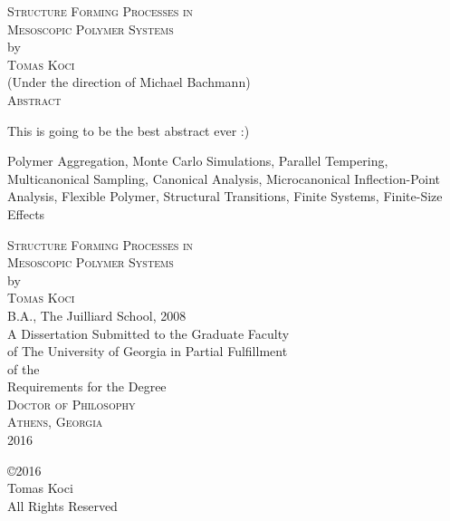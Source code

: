 \documentclass[12pt]{report}
\begin{document}
\newpage
\thispagestyle{empty}
\vspace*{18pt}
\begin{center}
\textsc{Structure Forming Processes in\\Mesoscopic Polymer Systems}\\[18pt]
by\\[18pt]
\textsc{Tomas Koci}\\[12pt]
(Under the direction of Michael Bachmann)\\[12pt]
\textsc{Abstract}
\end{center}
This is going to be the best abstract ever :)

\begin{list}{\sc Index words:\hfill}{\leftmargin 1.4in}
\item 
\begin{flushleft}\singlespacing
Polymer Aggregation,
Monte Carlo Simulations,
Parallel Tempering,
Multicanonical Sampling,
Canonical Analysis, 
Microcanonical Inflection-Point Analysis,
Flexible Polymer,
Structural Transitions,
Finite Systems,
Finite-Size Effects
\end{flushleft}
\end{list}



\newpage
\thispagestyle{empty}
\vspace*{18pt}
\begin{center}
\textsc{Structure Forming Processes in\\Mesoscopic Polymer Systems}\\[18pt]
by\\[18pt]
\textsc{Tomas Koci}\\[12pt]
B.A., The Juilliard School, 2008\\
\vfill
A Dissertation Submitted to the Graduate Faculty \\
of The University of Georgia in Partial Fulfillment \\
of the \\
Requirements for the Degree \\[10pt]
\textsc{Doctor of Philosophy}\\[36pt]
\textsc{Athens, Georgia}\\[18pt]
2016
\end{center}

\newpage
\thispagestyle{empty}
\vspace*{5.5in}
\begin{center}
\copyright 2016 \\
Tomas Koci \\
All Rights Reserved
\end{center}
\end{document}
